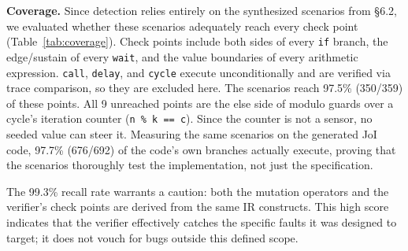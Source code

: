 \documentclass[sigconf,nonacm,anonymous,review]{acmart}
\begin{document}
\textbf{Coverage.} Since detection relies entirely on the synthesized scenarios from  \S6.2, we evaluated whether these scenarios adequately reach every check point (Table~\ref{tab:coverage}). Check points include 
both sides of every \texttt{if} branch, the edge/sustain of every \texttt{wait}, and the value boundaries of every arithmetic expression. \texttt{call}, \texttt{delay}, and \texttt{cycle} execute unconditionally and are verified via trace comparison, so they are excluded here. %
The scenarios reach 97.5\% (350/359) of these points. All 9 unreached points are the else side of modulo guards over a cycle's iteration counter (\texttt{n \% k == c}). Since the counter is not a sensor, no seeded value can steer it. Measuring the same scenarios on the generated JoI code, 97.7\% (676/692) of the code's own branches actually execute, proving that the scenarios thoroughly test the implementation, not just the specification. %

The 99.3\% recall rate warrants a caution: both the mutation operators and the verifier's check points are derived from the same IR constructs. This high score indicates that the verifier effectively catches the specific faults it was designed to target; it does not vouch for bugs outside this defined scope.
\end{document}

